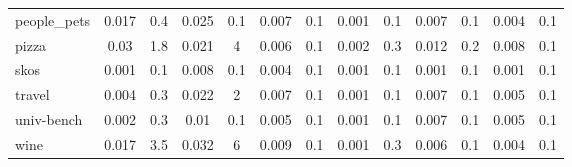 {\begin{table*}[h]
\begin{tabular}{| l | c  c | c  c | c  c | c  c | c  c | c  c |}
people\_pets                & 0.017 & 0.4  & 0.025 & 0.1 & 0.007 & 0.1   & 0.001 & 0.1  & 0.007 & 0.1 & 0.004 & 0.1   \\
pizza                       & 0.03  & 1.8  & 0.021 & 4   & 0.006 & 0.1   & 0.002 & 0.3  & 0.012 & 0.2 & 0.008 & 0.1   \\
skos                        & 0.001 & 0.1  & 0.008 & 0.1 & 0.004 & 0.1   & 0.001 & 0.1  & 0.001 & 0.1 & 0.001 & 0.1   \\
travel                      & 0.004 & 0.3  & 0.022 & 2   & 0.007 & 0.1   & 0.001 & 0.1  & 0.007 & 0.1 & 0.005 & 0.1   \\
univ-bench                  & 0.002 & 0.3  & 0.01  & 0.1 & 0.005 & 0.1   & 0.001 & 0.1  & 0.007 & 0.1 & 0.005 & 0.1   \\
wine                        & 0.017 & 3.5  & 0.032 & 6   & 0.009 & 0.1   & 0.001 & 0.3  & 0.006 & 0.1 & 0.004 & 0.1  \\
    \hline
  \end{tabular}
\end{table*}
}

